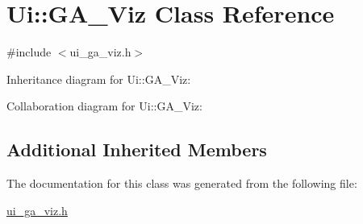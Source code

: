 \hypertarget{class_ui_1_1_g_a___viz}{}\section{Ui\+:\+:G\+A\+\_\+\+Viz Class Reference}
\label{class_ui_1_1_g_a___viz}


{\ttfamily \#include $<$ui\+\_\+ga\+\_\+viz.\+h$>$}



Inheritance diagram for Ui\+:\+:G\+A\+\_\+\+Viz\+:


Collaboration diagram for Ui\+:\+:G\+A\+\_\+\+Viz\+:
\subsection*{Additional Inherited Members}


The documentation for this class was generated from the following file\+:\begin{DoxyCompactItemize}
\item 
\hyperlink{ui__ga__viz_8h}{ui\+\_\+ga\+\_\+viz.\+h}\end{DoxyCompactItemize}
